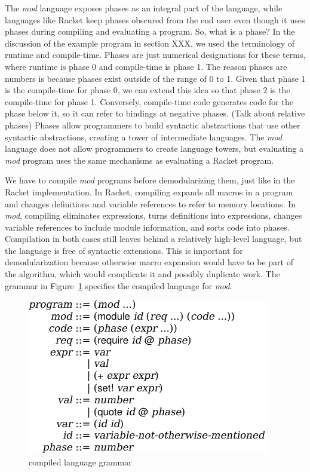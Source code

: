 The \emph{mod} language exposes phases as an integral part of the language, while languages like Racket keep phases obscured from the end user even though it uses phases during compiling and evaluating a program.
So, what is a phase?
In the discussion of the example program in section XXX, we used the terminology of runtime and compile-time.
Phases are just numerical designations for these terms, where runtime is phase 0 and compile-time is phase 1.
The reason phases are numbers is because phases exist outside of the range of 0 to 1.
Given that phase 1 is the compile-time for phase 0, we can extend this idea so that phase 2 is the compile-time for phase 1.
Conversely, compile-time code generates code for the phase below it, so it can refer to bindings at negative phases.
(Talk about relative phases)
Phases allow programmers to build syntactic abstractions that use other syntactic abstractions, creating a tower of intermediate languages.
The \emph{mod} language does not allow programmers to create language towers, but evaluating a \emph{mod} program uses the same mechanisms as evaluating a Racket program.

We have to compile \emph{mod} programs before demodularizing them, just like in the Racket implementation.
In Racket, compiling expands all macros in a program and changes definitions and variable references to refer to memory locations.
In \emph{mod}, compiling eliminates  expressions, turns definitions into  expressions, changes variable references to include module information, and sorts code into phases.
Compilation in both cases still leaves behind a relatively high-level language, but the language is free of syntactic extensions.
This is important for demodularization because otherwise macro expansion would have to be part of the algorithm, which would complicate it and possibly duplicate work.
The grammar in Figure~\ref{compiled-lang} specifies the compiled language for \emph{mod}.

\begin{figure}[h]
\includegraphics{compiled-lang}
\caption{compiled language grammar}
\label{compiled-lang}
\end{figure}

